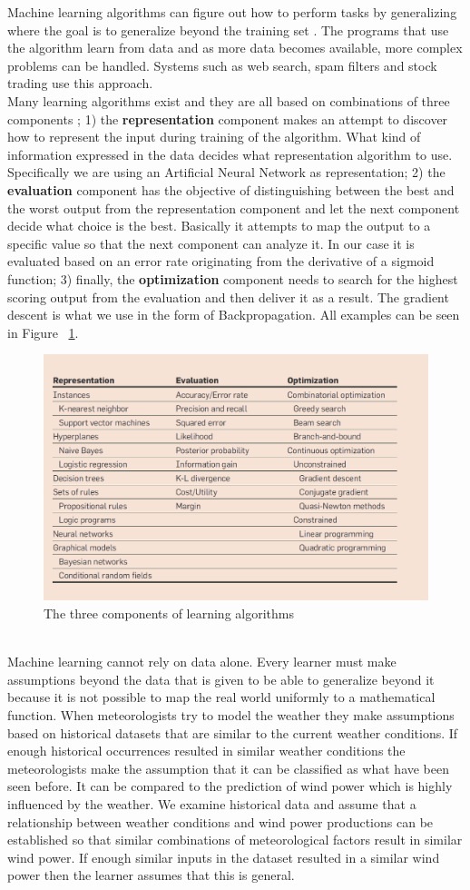 Machine learning algorithms can figure out how to perform tasks by generalizing where the goal is to generalize beyond the training set \cite{18}. The programs that use the algorithm learn from data and as more data becomes available, more complex problems can be handled. Systems such as web search, spam filters and stock trading use this approach.
\\[0.5cm]
Many learning algorithms exist and they are all based on combinations of three components \cite{18}; 1) the \textbf{representation} component makes an attempt to discover how to represent the input during training of the algorithm. What kind of information expressed in the data decides what representation algorithm to use. Specifically we are using an Artificial Neural Network as representation; 2) the \textbf{evaluation} component has the objective of distinguishing between the best and the worst output from the representation component and let the next component decide what choice is the best. Basically it attempts to map the output to a specific value so that the next component can analyze it. In our case it is evaluated based on an error rate originating from the derivative of a sigmoid function; 3) finally, the \textbf{optimization} component needs to search for the highest scoring output from the evaluation and then deliver it as a result. The gradient descent is what we use in the form of Backpropagation. All examples can be seen in Figure ~\ref{fig:threeComponents}.
\begin{figure}[!ht]
\centering
\includegraphics[width=0.6\linewidth,natwidth=898,natheight=587]{billeder/Table1-TheComponentsOfLearningAlgorithms.png}
\caption{The three components of learning algorithms \cite{18}}
\label{fig:threeComponents}
\end{figure}
\\[0.5cm] 
Machine learning cannot rely on data alone. Every learner must make assumptions beyond the data that is given to be able to generalize beyond it \cite{18} because it is not possible to map the real world uniformly to a mathematical function. When meteorologists try to model the weather they make assumptions based on historical datasets that are similar to the current weather conditions. If enough historical occurrences resulted in similar weather conditions the meteorologists make the assumption that it can be classified as what have been seen before. It can be compared to the prediction of wind power which is highly influenced by the weather. We examine historical data and assume that a relationship between weather conditions and wind power productions can be established so that similar combinations of meteorological factors result in similar wind power. If enough similar inputs in the dataset resulted in a similar wind power then the learner assumes that this is general.
